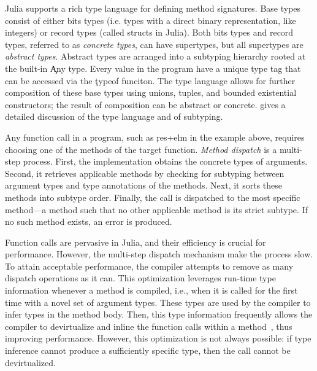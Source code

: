 \documentclass[sigplan,screen]{acmart}
\begin{document}


Julia supports a rich type language for defining method signatures. Base types
consist of either bits types (i.e. types with a direct binary representation,
like integers) or record types (called structs in Julia). Both bits types and
record types, referred to as \emph{concrete types}, can have supertypes, but all
supertypes are \emph{abstract types}. Abstract types are arranged into a
subtyping hierarchy rooted at the built-in \c{Any} type. Every value in the
program have a unique type tag that can be accessed via the \c{typeof} funciton.
%
The type language allows for further composition of these base
types using unions, tuples, and bounded existential constructors; the result of
composition can be abstract or concrete. \citet{oopsla18b} gives a detailed
discussion of the type language and of subtyping.

Any function call in a program, such as \c{res+elm} in the example above,
requires choosing one of the methods of the target function. \emph{Method
dispatch} is a multi-step process. First, the implementation obtains the
concrete types of arguments. Second, it retrieves applicable methods by checking
for subtyping between argument types and type annotations of the methods. Next,
it sorts these methods into subtype order. Finally, the call is dispatched to
the most specific method---a method such that no other applicable method is its
strict subtype. If no such method exists, an error is produced.

Function calls are pervasive in Julia, and their efficiency is crucial for
performance. However, the multi-step dispatch mechanism
make the process slow. To attain acceptable performance, the compiler attempts
to remove as many dispatch operations as it can. This optimization leverages
run-time type information whenever a method is compiled, i.e., when it is called
for the first time with a novel set of argument types.  These types are used by
the compiler to infer types in the method body. Then, this type information
frequently allows the compiler to devirtualize and inline the function calls
within a method~\cite{aigner}, thus improving performance. However, this
optimization is not always possible: if type inference cannot produce a
sufficiently specific type, then the call cannot be devirtualized.
\end{document}
